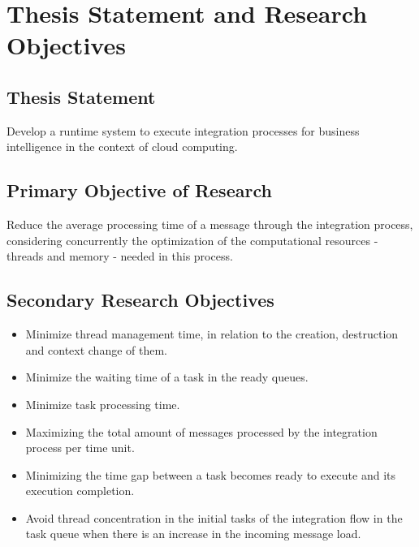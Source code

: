 \section{Thesis Statement and Research Objectives}
\label{sec:statement}

\noindent 

\subsection{Thesis Statement}
\label{subsec:statement}

Develop a runtime system to execute integration processes for business intelligence in the context of cloud computing.

\subsection{Primary Objective of Research}
\label{subsec:primary_objectives}

Reduce the average processing time of a message through the integration process, considering concurrently the optimization of the computational resources - threads and memory - needed in this process.

\subsection{Secondary Research Objectives}
\label{subsec:secondary_objectives}

\begin{itemize}
\item Minimize thread management time, in relation to the creation, destruction and context change of them.
\item Minimize the waiting time of a task in the ready queues.
\item Minimize task processing time.
\item Maximizing the total amount of messages processed by the integration process per time unit.
\item Minimizing the time gap between a task becomes ready to execute and its execution completion.
\item Avoid thread concentration in the initial tasks of the integration flow in the task queue when there is an increase in the incoming message load.
\end{itemize}